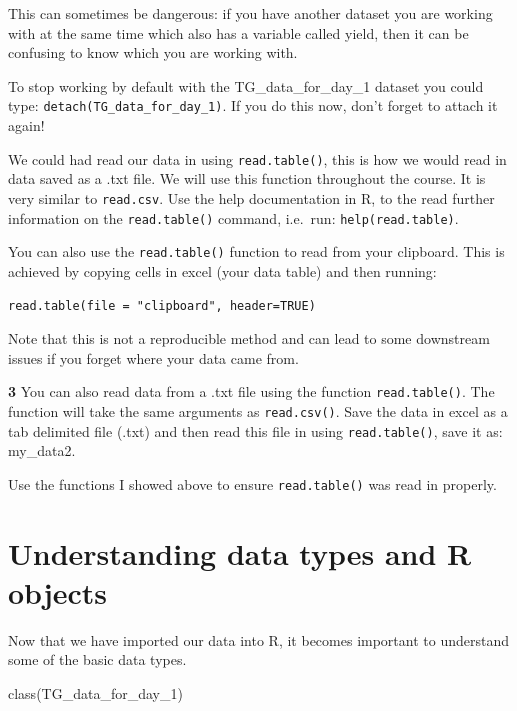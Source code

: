 \documentclass[
]{book}
\makeatletter
\newenvironment{Shaded}{\begin{snugshade}}{\end{snugshade}}
\newcommand{\FunctionTok}[1]{\textcolor[rgb]{0.00,0.00,0.00}{#1}}
\newcommand{\NormalTok}[1]{#1}
\newenvironment{kframe}{%
\medskip{}
\setlength{\fboxsep}{.8em}
 \def\at@end@of@kframe{}%
 \ifinner\ifhmode%
  \def\at@end@of@kframe{\end{minipage}}%
  \begin{minipage}{\columnwidth}%
 \fi\fi%
 \def\FrameCommand##1{\hskip\@totalleftmargin \hskip-\fboxsep
 \colorbox{shadecolor}{##1}\hskip-\fboxsep
     \hskip-\linewidth \hskip-\@totalleftmargin \hskip\columnwidth}%
 \MakeFramed {\advance\hsize-\width
   \@totalleftmargin\z@ \linewidth\hsize
   \@setminipage}}%
 {\par\unskip\endMakeFramed%
 \at@end@of@kframe}
\newenvironment{rmdblock}[1]
  {
  \begin{itemize}
  \renewcommand{\labelitemi}{
    \raisebox{-.7\height}[0pt][0pt]{
      {\setkeys{Gin}{width=3em,keepaspectratio}\texttt{[image: images/\#1]}}
    }
  }
  \setlength{\fboxsep}{1em}
  \begin{kframe}
  \item
  }
  {
  \end{kframe}
  \end{itemize}
  }
\newenvironment{rmdquiz}
  {\begin{rmdblock}{quiz}}
  {\end{rmdblock}}
\newenvironment{rmdwarning}
  {\begin{rmdblock}{warning}}
  {\end{rmdblock}}
\makeatother
\begin{document}
\begin{rmdwarning}
This can sometimes be dangerous: if you have another dataset you are working with at the same time which also has a variable called yield, then it can be confusing to know which you are working with.
\end{rmdwarning}

To stop working by default with the TG\_data\_for\_day\_1 dataset you could type: \texttt{detach(TG\_data\_for\_day\_1)}. If you do this now, don't forget to attach it again!

We could had read our data in using \texttt{read.table()}, this is how we would read in data saved as a .txt file. We will use this function throughout the course. It is very similar to \texttt{read.csv}. Use the help documentation in R, to the read further information on the \texttt{read.table()} command, i.e.~run: \texttt{help(read.table)}.

You can also use the \texttt{read.table()} function to read from your clipboard. This is achieved by copying cells in excel (your data table) and then running:

\texttt{read.table(file\ =\ "clipboard",\ header=TRUE)}

Note that this is not a reproducible method and can lead to some downstream issues if you forget where your data came from.

\begin{rmdquiz}
\textbf{3} You can also read data from a .txt file using the function \texttt{read.table()}. The function will take the same arguments as \texttt{read.csv()}. Save the data in excel as a tab delimited file (.txt) and then read this file in using \texttt{read.table()}, save it as: my\_data2.

Use the functions I showed above to ensure \texttt{read.table()} was read in properly.
\end{rmdquiz}

\hypertarget{understanding-data-types-and-r-objects}{%
\section{Understanding data types and R objects}\label{understanding-data-types-and-r-objects}}

Now that we have imported our data into R, it becomes important to understand some of the basic data types.

\begin{Shaded}
\begin{Highlighting}[]
\FunctionTok{class}\NormalTok{(TG\_data\_for\_day\_1)}
\end{Highlighting}
\end{Shaded}
\end{document}
